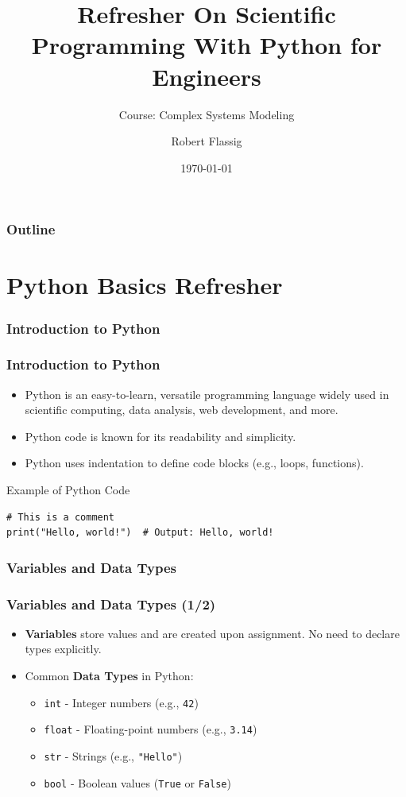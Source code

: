 \documentclass{beamer}
\title{Refresher On Scientific Programming With Python for Engineers}
\subtitle{Course: Complex Systems Modeling}
\author{Robert Flassig}
\institute{Brandenburg University of Applied Sciences}
\date{\today}
\begin{document}
\begin{frame}
\titlepage
\end{frame}

\begin{frame}
\frametitle{Outline}
\tableofcontents
\end{frame}

\section{Python Basics Refresher}

\subsubsection*{Introduction to Python}

\begin{frame}[fragile]
\frametitle{Introduction to Python}
\begin{itemize}
    \item Python is an easy-to-learn, versatile programming language widely used in scientific computing, data analysis, web development, and more.
    \item Python code is known for its readability and simplicity.
    \item Python uses indentation to define code blocks (e.g., loops, functions).
\end{itemize}

\begin{block}{Example of Python Code}
\begin{verbatim}
# This is a comment
print("Hello, world!")  # Output: Hello, world!
\end{verbatim}
\end{block}
\end{frame}

\subsubsection*{Variables and Data Types}

\begin{frame}
\frametitle{Variables and Data Types (1/2)}
\begin{itemize}
    \item \textbf{Variables} store values and are created upon assignment. No need to declare types explicitly.
    \item Common \textbf{Data Types} in Python:
    \begin{itemize}
        \item \texttt{int} - Integer numbers (e.g., \texttt{42})
        \item \texttt{float} - Floating-point numbers (e.g., \texttt{3.14})
        \item \texttt{str} - Strings (e.g., \texttt{"Hello"})
        \item \texttt{bool} - Boolean values (\texttt{True} or \texttt{False})
    \end{itemize}
\end{itemize}

\end{frame}
\end{document}
